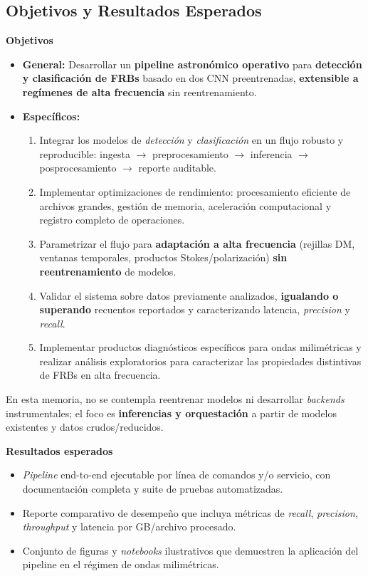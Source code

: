 \medskip

\subsection{Objetivos y Resultados Esperados}

\textbf{Objetivos}
\begin{itemize}
\item \textbf{General:} Desarrollar un \textbf{pipeline astronómico operativo} para \textbf{detección y clasificación de FRBs} basado en dos CNN preentrenadas, \textbf{extensible a regímenes de alta frecuencia} sin reentrenamiento.
\item \textbf{Específicos:}
\begin{enumerate}
\item Integrar los modelos de \emph{detección} y \emph{clasificación} en un flujo robusto y reproducible: ingesta $\to$ preprocesamiento $\to$ inferencia $\to$ posprocesamiento $\to$ reporte auditable.
\item Implementar optimizaciones de rendimiento: procesamiento eficiente de archivos grandes, gestión de memoria, aceleración computacional y registro completo de operaciones.
\item Parametrizar el flujo para \textbf{adaptación a alta frecuencia} (rejillas DM, ventanas temporales, productos Stokes/polarización) \textbf{sin reentrenamiento} de modelos.
\item Validar el sistema sobre datos previamente analizados, \textbf{igualando o superando} recuentos reportados y caracterizando latencia, \emph{precision} y \emph{recall}.
\item Implementar productos diagnósticos específicos para ondas milimétricas y realizar análisis exploratorios para caracterizar las propiedades distintivas de FRBs en alta frecuencia.
\end{enumerate}
\end{itemize}

\medskip
En esta memoria, no se contempla reentrenar modelos ni desarrollar \emph{backends} instrumentales; el foco es \textbf{inferencias y orquestación} a partir de modelos existentes y datos crudos/reducidos.

\medskip
\noindent\textbf{Resultados esperados}
\begin{itemize}
\item \emph{Pipeline} end-to-end ejecutable por línea de comandos y/o servicio, con documentación completa y suite de pruebas automatizadas.
\item Reporte comparativo de desempeño que incluya métricas de \emph{recall}, \emph{precision}, \emph{throughput} y latencia por GB/archivo procesado.
\item Conjunto de figuras y \emph{notebooks} ilustrativos que demuestren la aplicación del pipeline en el régimen de ondas milimétricas.
\end{itemize}

